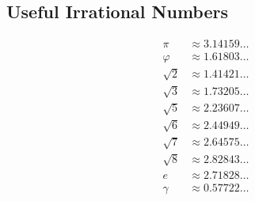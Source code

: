 \documentclass[12pt]{article}
\begin{document}
\subsection*{Useful Irrational Numbers}
\begin{align*}
     \pi & \approx 3.14159 \ldots \\
 \varphi & \approx 1.61803 \ldots \\
\sqrt{2} & \approx 1.41421 \ldots \\
\sqrt{3} & \approx 1.73205 \ldots \\
\sqrt{5} & \approx 2.23607 \ldots \\
\sqrt{6} & \approx 2.44949 \ldots \\
\sqrt{7} & \approx 2.64575 \ldots \\
\sqrt{8} & \approx 2.82843 \ldots \\
       e & \approx 2.71828 \ldots \\
  \gamma & \approx 0.57722 \ldots \\
\end{align*}
\end{document}
